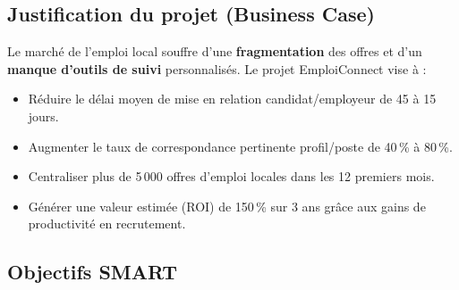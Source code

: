 \documentclass[11pt,a4paper]{article}
\begin{document}
\subsection{Justification du projet (Business Case)}

Le marché de l'emploi local souffre d'une \textbf{fragmentation} des offres et d'un \textbf{manque d'outils de suivi} personnalisés. Le projet EmploiConnect vise à :

\begin{itemize}
    \item Réduire le délai moyen de mise en relation candidat/employeur de 45 à 15 jours.
    \item Augmenter le taux de correspondance pertinente profil/poste de 40\,\% à 80\,\%.
    \item Centraliser plus de 5\,000 offres d'emploi locales dans les 12 premiers mois.
    \item Générer une valeur estimée (ROI) de 150\,\% sur 3 ans grâce aux gains de productivité en recrutement.
\end{itemize}

\subsection{Objectifs SMART}
\end{document}
